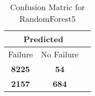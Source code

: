 \begin{table}[] 
\caption{Confusion Matric for RandomForest5} 
\label{Table: Prediction Accuracy-DMDRandomForest5OnlySunEKF-resetReflectionEKF-top2perfectNoFailurePrediction-Reflection} 
\centering 
\begin{tabular} 
 {@{}ccc@{}} 
\toprule 
\multicolumn{2}{c}{\textbf{Predicted}}
 \\ \midrule 
\multicolumn{1}{|c|}{Failure} & 
\multicolumn{1}{c|}{No Failure}
 \\ \midrule 
\multicolumn{1}{|c|}{\color{green}\textbf{8225}} & 
\multicolumn{1}{c|}{\color{red}\textbf{54}}
 \\ \midrule 
\multicolumn{1}{|c|}{\color{red}\textbf{2157}} & 
\multicolumn{1}{c|}{\color{green}\textbf{684}}
 \\ \bottomrule 
\end{tabular} 
\end{table} 
